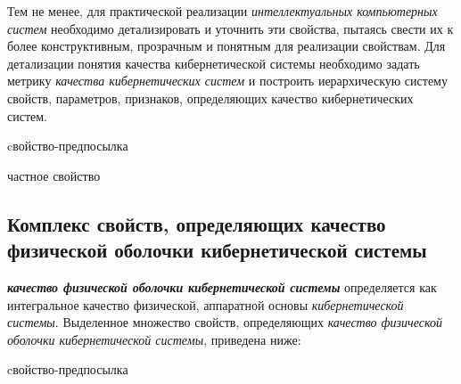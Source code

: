 Тем не менее, для практической реализации \textit{интеллектуальных компьютерных систем} необходимо детализировать и уточнить эти свойства, пытаясь свести их к более конструктивным, прозрачным и понятным для реализации свойствам. Для детализации понятия качества кибернетической системы необходимо задать метрику \textit{качества кибернетических систем} и построить иерархическую систему свойств, параметров, признаков, определяющих качество кибернетических систем.

\begin{SCn}
\begin{scnrelfromlist}{cвойство-предпосылка}
    \begin{scnrelfromset}{частное свойство}
    \end{scnrelfromset}
\end{scnrelfromlist}
\end{SCn}


\subsection{Комплекс свойств, определяющих качество физической оболочки кибернетической системы}
{\label{sec_cyb_syst_physical_shell_quality}} 

\textbf{\textit{качество физической оболочки кибернетической системы}} определяется как интегральное качество физической, аппаратной основы \textit{кибернетической системы}. Выделенное множество свойств, определяющих \textit{качество физической оболочки кибернетической системы}, приведена ниже:
 
\begin{SCn}
\begin{scnrelfromlist}{cвойство-предпосылка}
\end{scnrelfromlist}
\end{SCn}

